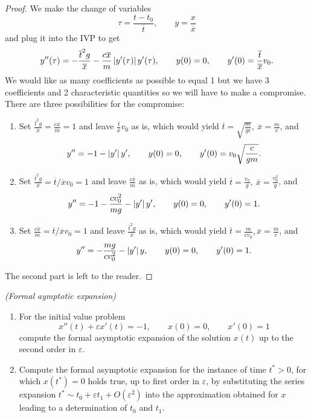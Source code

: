 \begin{proof}
  We make the change of variables
  \[
    \tau = \frac{t - t_0}{\overline{t}},\qquad
    y = \frac{x}{\overline{x}}
  \]
  and plug it into the IVP to get
  \[
      y''(\tau) = - \frac{\overline{t}^2 g}{\overline{x}}
        - \frac{c\overline{x}}{m} \left\vert{y'(\tau)}\right\vert y'(\tau),\qquad
      y(0) = 0,\qquad
      y'(0) = \frac{\overline{t}}{\overline{x}} v_0.
  \]
  We would like as many coefficients as possible to equal 1 but we have 3
  coefficients and 2 characteristic quantities so we will have to make a
  compromise. There are three possibilities for the compromise:
  \begin{enumerate}
    \item Set $\frac{\overline{t}^2 g}{\overline{x}} = \frac{c\overline{x}}{m}
      = 1$ and leave $\frac{\overline{t}}{\overline{x}} v_0$ as is, which would
      yield $\overline{t} = \sqrt{\frac{m}{gc} },\ \overline{x} = \frac{m}{c} $, and
      \[
        y'' = -1 - \left\vert{y'}\right\vert{y'},\qquad
        y(0) = 0,\qquad
        y'(0) = v_0\sqrt{\frac{c}{gm}}. 
      \]
    \item Set $\frac{\overline{t}^2 g}{\overline{x}} =
      \overline{t}/\overline{x} v_0 = 1$ and leave $\frac{c\overline{x}}{m}$ as
      is, which would yield $\overline{t} = \frac{v_0}{g},\ \overline{x} =
      \frac{v_0^2}{g}$, and
      \[
        y'' = -1 - \frac{cv_0^2}{mg} - \left\vert{y'}\right\vert y',\qquad
        y(0) = 0,\qquad
        y'(0) = 1.
      \]
    \item Set $\frac{c\overline{x}}{m} = \overline{t}/\overline{x} v_0 = 1$
      and leave $\frac{\overline{t}^2 g}{\overline{x}}$ as is, which would
      yield $\overline{t} = \frac{m}{c v_0}, \overline{x} = \frac{m}{c}$, and
      \[
        y'' = - \frac{mg}{cv_0^2} - \left\vert{y'}\right\vert y,\qquad
        y(0) = 0,\qquad
        y'(0) = 1.
      \]
  \end{enumerate}

  The second part is left to the reader.
\end{proof}


\begin{ex}
  [1.8]
  \textit{(Formal aymptotic expansion)}
  \begin{enumerate}
    \item For the initial value problem
      \[
        x''(t) + \varepsilon x'(t) = -1,\qquad
        x(0) = 0,\qquad
        x'(0) = 1
      \]
      compute the formal asymptotic expansion of the solution $x(t)$ up to the second order in $\varepsilon$.
    \item Compute the formal asymptotic expansion for the instance of time $t^*
      > 0$, for which $x(t^*) = 0$ holds true, up to first order in
      $\varepsilon$, by substituting the series expansion $t^* \sim t_0 +
      \varepsilon t_1 + O(\varepsilon^2)$ into the approximation obtained for
      $x$ leading to a determination of $t_0$ and $t_1$.
  \end{enumerate}
\end{ex}

